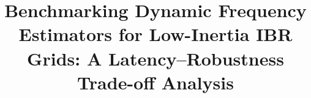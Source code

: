 \title{Benchmarking Dynamic Frequency Estimators for Low-Inertia IBR Grids: A Latency--Robustness Trade-off Analysis}
	
